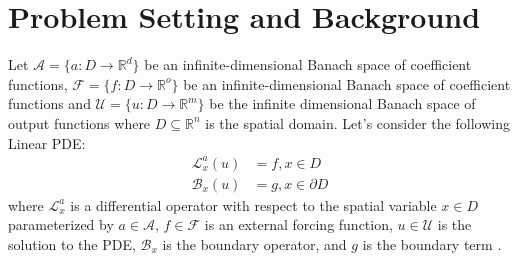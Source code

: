 \documentclass[12pt]{article}
\begin{document}


\section{Problem Setting and Background} \label{sec:background}

Let $\mathcal{A} = \{a: D \to \mathbb{R}^d\}$ be an infinite-dimensional Banach space of coefficient functions, $\mathcal{F} = \{f: D \to \mathbb{R}^o\}$ be an infinite-dimensional Banach space of coefficient functions and $\mathcal{U} = \{u: D \to \mathbb{R}^m\}$ be the infinite dimensional Banach space of output functions where $D \subseteq \mathbb{R}^n$ is the spatial domain. Let's consider the following Linear PDE:
\begin{equation} \label{eq:mainpde}
    \begin{split}
    \mathcal{L}_{x}^a\left(u\right) &= f ,x \in D \\
    \mathcal{B}_{x}\left(u\right) &= g ,x \in \partial D
    \end{split}
\end{equation}
where $\mathcal{L}_x^a$ is a differential operator with respect to the spatial variable $x \in D$ parameterized by $a \in \mathcal{A}$,  $f \in \mathcal{F}$ is an external forcing function,  $u \in \mathcal{U}$ is the solution to the PDE, $\mathcal{B}_{x}$ is the boundary operator, and $g$ is the boundary term .  
\end{document}

